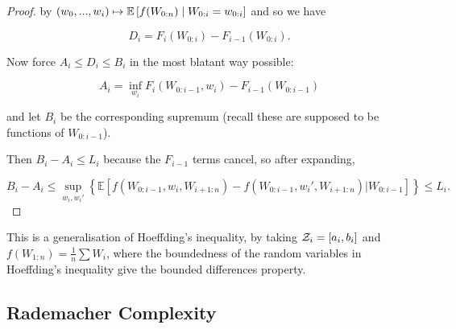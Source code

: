 \documentclass[11pt]{scrartcl}
\begin{document}
\begin{theorem}
\begin{proof}
by $(w_0, ... , w_i) \mapsto \mathbb{E} \left[ f(W_{0:n}) \mid W_{0:i} = w_{0:i} \right]$ and so we have

\begin{equation}
    D_i = F_i(W_{0:i}) - F_{i-1}(W_{0:i}).
\end{equation}

Now force $A_i \le D_i \le B_i$ in the most blatant way possible:

\begin{equation}
    A_i = \inf_{w_i} F_i(W_{0:i-1},w_i) - F_{i-1}(W_{0:i-1})
\end{equation}

and let $B_i$ be the corresponding supremum (recall these are supposed to be functions of $W_{0:i-1}$). 

Then $B_i - A_i \le L_i$ because the $F_{i-1}$ terms cancel, so after expanding, 

\begin{equation}
    B_i - A_i \le \sup_{w_i, w_i'} \left\{ \mathbb{ E}[ f(W_{0:i-1} , w_i , W_{i+1:n} ) - f(W_{0:i-1} , w_i' , W_{i+1:n} ) | W_{0:i-1} ] \right\} \le L_i. %
\end{equation} 





\end{proof}
\end{theorem}

This is a generalisation of Hoeffding's inequality, by taking $\mathcal{Z}_i = [a_i, b_i]$ and $f(W_{1:n}) = \frac1n \sum W_i$, where the boundedness of the random variables in Hoeffding's inequality give the bounded differences property.

\subsection{Rademacher Complexity}
\end{document}
